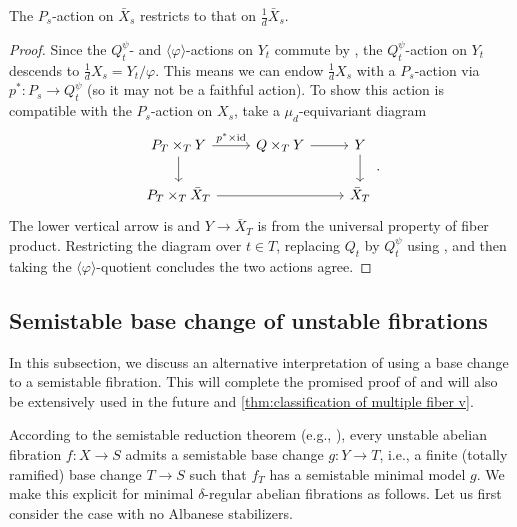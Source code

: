 \documentclass[reqno, letterpaper]{amsart}
\numberwithin{equation}{subsection}
\let\to\longrightarrow
\DeclareMathOperator{\id}{id}
\begin{document}
			\begin{lemma} \label{lem:P-action on 1/d X_s}
				The $P_s$-action on $\bar X_s$ restricts to that on $\frac{1}{d} \bar X_s$.
			\end{lemma}
			\begin{proof}
				Since the $Q_t^\psi$- and $\langle \varphi \rangle$-actions on $Y_t$ commute by , the $Q_t^\psi$-action on $Y_t$ descends to $\frac{1}{d} X_s = Y_t / \varphi$. This means we can endow $\frac{1}{d} X_s$ with a $P_s$-action via $p^* : P_s \to Q_t^\psi$ (so it may not be a faithful action). To show this action is compatible with the $P_s$-action on $X_s$, take a $\mu_d$-equivariant diagram
				\[\begin{tikzcd}[column sep=normal]
					P_T \times_T Y \arrow[r, "p^* \times \id"] \arrow[d] & Q \times_T Y \arrow[r] & Y \arrow[d] \\
					P_T \times_T \bar X_T \arrow[rr] & & \bar X_T
				\end{tikzcd}.\]
				The lower vertical arrow is  and $Y \to \bar X_T$ is from the universal property of fiber product. Restricting the diagram over $t \in T$, replacing $Q_t$ by $Q_t^\psi$ using , and then taking the $\langle \varphi \rangle$-quotient concludes the two actions agree.
			\end{proof}
			
			
			
	\subsection{Semistable base change of unstable fibrations}
		In this subsection, we discuss an alternative interpretation of  using a base change to a semistable fibration. This will complete the promised proof of  and will also be extensively used in the future  and \ref{thm:classification of multiple fiber v}.
		
		According to the semistable reduction theorem (e.g., \cite[Theorem~7.4.1]{neron}), every unstable abelian fibration $f : X \to S$ admits a semistable base change $g : Y \to T$, i.e., a finite (totally ramified) base change $T \to S$ such that $f_T$ has a semistable minimal model $g$. We make this explicit for minimal $\delta$-regular abelian fibrations as follows. Let us first consider the case with no Albanese stabilizers.
		
\end{document}
